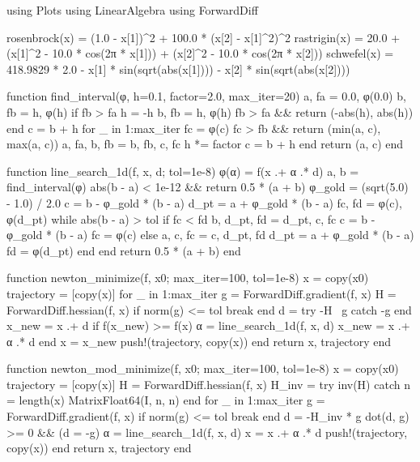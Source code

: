 \documentclass[a4paper, 14pt]{extarticle}
\begin{document}
\begin{breakablelisting}
using Plots
using LinearAlgebra
using ForwardDiff

rosenbrock(x) = (1.0 - x[1])^2 + 100.0 * (x[2] - x[1]^2)^2
rastrigin(x) = 20.0 + (x[1]^2 - 10.0 * cos(2π * x[1])) + (x[2]^2 - 10.0 * cos(2π * x[2]))
schwefel(x) = 418.9829 * 2.0 - x[1] * sin(sqrt(abs(x[1]))) - x[2] * sin(sqrt(abs(x[2])))

function find_interval(φ, h=0.1, factor=2.0, max_iter=20)
    a, fa = 0.0, φ(0.0)
    b, fb = h, φ(h)
    if fb > fa
        h = -h
        b, fb = h, φ(h)
        fb > fa && return (-abs(h), abs(h))
    end
    c = b + h
    for _ in 1:max_iter
        fc = φ(c)
        fc > fb && return (min(a, c), max(a, c))
        a, fa, b, fb = b, fb, c, fc
        h *= factor
        c = b + h
    end
    return (a, c)
end

function line_search_1d(f, x, d; tol=1e-8)
    φ(α) = f(x .+ α .* d)
    a, b = find_interval(φ)
    abs(b - a) < 1e-12 && return 0.5 * (a + b)
    φ_gold = (sqrt(5.0) - 1.0) / 2.0
    c = b - φ_gold * (b - a)
    d_pt = a + φ_gold * (b - a)
    fc, fd = φ(c), φ(d_pt)
    while abs(b - a) > tol
        if fc < fd
            b, d_pt, fd = d_pt, c, fc
            c = b - φ_gold * (b - a)
            fc = φ(c)
        else
            a, c, fc = c, d_pt, fd
            d_pt = a + φ_gold * (b - a)
            fd = φ(d_pt)
        end
    end
    return 0.5 * (a + b)
end

function newton_minimize(f, x0; max_iter=100, tol=1e-8)
    x = copy(x0)
    trajectory = [copy(x)]
    for _ in 1:max_iter
        g = ForwardDiff.gradient(f, x)
        H = ForwardDiff.hessian(f, x)
        if norm(g) <= tol
            break
        end
        d = try
            -H \ g
        catch
            -g
        end
        x_new = x .+ d
        if f(x_new) >= f(x)
            α = line_search_1d(f, x, d)
            x_new = x .+ α .* d
        end
        x = x_new
        push!(trajectory, copy(x))
    end
    return x, trajectory
end

function newton_mod_minimize(f, x0; max_iter=100, tol=1e-8)
    x = copy(x0)
    trajectory = [copy(x)]
    H = ForwardDiff.hessian(f, x)
    H_inv = try
        inv(H)
    catch
        n = length(x)
        Matrix{Float64}(I, n, n)
    end
    for _ in 1:max_iter
        g = ForwardDiff.gradient(f, x)
        if norm(g) <= tol
            break
        end
        d = -H_inv * g
        dot(d, g) >= 0 && (d = -g)
        α = line_search_1d(f, x, d)
        x = x .+ α .* d
        push!(trajectory, copy(x))
    end
    return x, trajectory
end


\end{breakablelisting}
\end{document}

